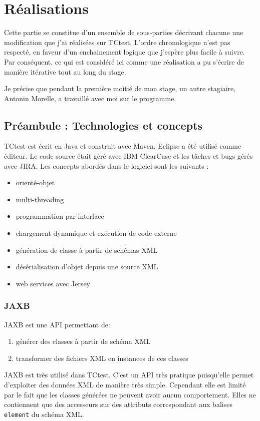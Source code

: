 \section{Réalisations}

Cette partie se constitue d'un ensemble de sous-parties décrivant chacune une 
modification que j'ai réalisées sur TCtest. L'ordre chronologique n'est pas 
respecté, en faveur d'un enchainement logique que j'espère plus facile à 
suivre. Par conséquent, ce qui est considéré ici comme une réalisation a pu 
s'écrire de manière itérative tout au long du stage.

Je précise que pendant la première moitié de mon stage, un autre 
stagiaire, Antonin Morelle, a travaillé avec moi sur le programme.

\subsection{Préambule : Technologies et concepts}

TCtest est écrit en Java et construit avec Maven. Eclipse a été utilisé comme 
éditeur. Le code source était géré avec IBM ClearCase et les tâches et bugs 
gérés avec JIRA. Les concepts abordés dans le logiciel sont les suivants :
\begin{itemize}
	\item{orienté-objet}
	\item{multi-threading}
	\item{programmation par interface}
	\item{chargement dynamique et exécution de code externe}
	\item{génération de classe à partir de schémas XML}
	\item{désérialisation d'objet depuis une source XML}
	\item{web services avec Jersey}
\end{itemize}

\subsubsection{JAXB}

JAXB est une API permettant de:
\begin{enumerate}
	\item{générer des classes à partir de schéma XML}
	\item{transformer des fichiers XML en instances de ces classes}
\end{enumerate}
JAXB est très utilisé dans TCtest. C'est un API très pratique puisqu'elle 
permet d'exploiter des données XML de manière très simple. Cependant elle 
est limité par le fait que les classes générées ne peuvent avoir aucun 
comportement. Elles ne contiennent que des accesseurs sur des attributs 
correspondant aux balises \verb|element| du schéma XML.

